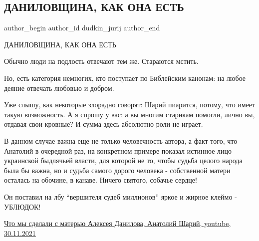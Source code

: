  
 
 
 
 
 
\subsection{ДАНИЛОВЩИНА, КАК ОНА ЕСТЬ}
\label{sec:30_11_2021.fb.dudkin_jurij.1.danilovschina}
 
\ifcmt
 author_begin
   author_id dudkin_jurij
 author_end
\fi

ДАНИЛОВЩИНА, КАК ОНА ЕСТЬ

Обычно люди на подлость отвечают тем же. Стараются мстить.

Но, есть категория немногих, кто поступает по Библейским канонам: на любое
деяние отвечать любовью и добром.

Уже слышу, как некоторые злорадно говорят: Шарий пиарится, потому, что имеет
такую возможность. А я спрошу у вас: а вы многим старикам помогли, лично вы,
отдавая свои кровные? И сумма здесь абсолютно роли не играет.

В данном случае важна еще не только человечность автора, а факт того, что
Анатолий в очередной раз, на конкретном примере показал истинное лицо
украинской быдлячьей власти, для которой не то, чтобы судьба целого народа была
бы важна, но и судьба самого дорого человека - собственной матери осталась на
обочине, в канаве. Ничего святого, собачье сердце!

Он поставил на лбу \enquote{вершителя судеб миллионов} яркое и жирное клеймо -
УБЛЮДОК!

\href{https://youtu.be/wSJLgJM7REM}{%
Что мы сделали с матерью Алексея Данилова, Анатолий Шарий, youtube, 30.11.2021%
}
